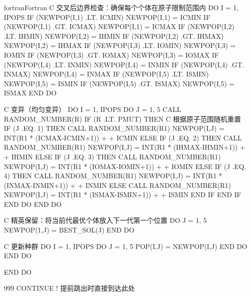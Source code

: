 \begin{envcode}{fortran}{Fortran}
C         交叉后边界检查：确保每个个体在原子限制范围内
          DO I = 1, IPOPS
              IF (NEWPOP(I,1) .LT. ICMIN) NEWPOP(I,1) = ICMIN
              IF (NEWPOP(I,1) .GT. ICMAX) NEWPOP(I,1) = ICMAX
              IF (NEWPOP(I,2) .LT. IHMIN) NEWPOP(I,2) = IHMIN
              IF (NEWPOP(I,2) .GT. IHMAX) NEWPOP(I,2) = IHMAX
              IF (NEWPOP(I,3) .LT. IOMIN) NEWPOP(I,3) = IOMIN
              IF (NEWPOP(I,3) .GT. IOMAX) NEWPOP(I,3) = IOMAX
              IF (NEWPOP(I,4) .LT. INMIN) NEWPOP(I,4) = INMIN
              IF (NEWPOP(I,4) .GT. INMAX) NEWPOP(I,4) = INMAX
              IF (NEWPOP(I,5) .LT. ISMIN) NEWPOP(I,5) = ISMIN
              IF (NEWPOP(I,5) .GT. ISMAX) NEWPOP(I,5) = ISMAX
          END DO
          
C         变异（均匀变异）
          DO I = 1, IPOPS
              DO J = 1, 5
                  CALL RANDOM_NUMBER(R)
                  IF (R .LT. PMUT) THEN
C                     根据原子范围随机重置
                      IF (J .EQ. 1) THEN
                          CALL RANDOM_NUMBER(R1)
                          NEWPOP(I,J) = INT(R1 * (ICMAX-ICMIN+1))
     +                                + ICMIN
                      ELSE IF (J .EQ. 2) THEN
                          CALL RANDOM_NUMBER(R1)
                          NEWPOP(I,J) = INT(R1 * (IHMAX-IHMIN+1))
     +                                + IHMIN
                      ELSE IF (J .EQ. 3) THEN
                          CALL RANDOM_NUMBER(R1)
                          NEWPOP(I,J) = INT(R1 * (IOMAX-IOMIN+1))
     +                                + IOMIN
                      ELSE IF (J .EQ. 4) THEN
                          CALL RANDOM_NUMBER(R1)
                          NEWPOP(I,J) = INT(R1 * (INMAX-INMIN+1))
     +                                + INMIN
                      ELSE
                          CALL RANDOM_NUMBER(R1)
                          NEWPOP(I,J) = INT(R1 * (ISMAX-ISMIN+1))
     +                                + ISMIN
                      END IF
                  END IF
              END DO
          END DO
          
C         精英保留：将当前代最优个体放入下一代第一个位置
          DO J = 1, 5
              NEWPOP(1,J) = BEST_SOL(J)
          END DO
          
C         更新种群
          DO I = 1, IPOPS
              DO J = 1, 5
                  POP(I,J) = NEWPOP(I,J)
              END DO
          END DO
          
      END DO

999   CONTINUE   ! 提前跳出时直接到达此处
      

\end{envcode}
